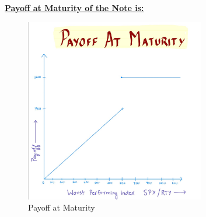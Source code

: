 \documentclass[12pt,a4paper]{article}
\begin{document}
\underline{\textbf{Payoff at Maturity of the Note is:}}
\begin{figure}[H]
    \centering
    \includegraphics[width=0.7\textwidth, height=0.4\textheight]{images_project_2/payoff_project_2.png}
    \caption{Payoff at Maturity}
    \label{fig:yourlabel}
\end{figure}

\clearpage  %
\end{document}
